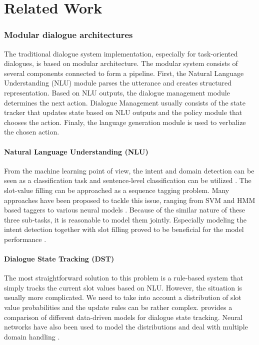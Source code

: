 \chapter{Related Work}%
\label{chap:related}
\label{sec:relwork}

\subsection{Modular dialogue architectures}
\label{relwork:modular}
The traditional dialogue system implementation, especially for task-oriented dialogues, is based on modular architecture.
The modular system consists of several components connected to form a pipeline.
First, the Natural Language Understanding (NLU) module parses the utterance and creates structured representation.
Based on NLU outputs, the dialogue management module determines the next action.
Dialogue Management usually consists of the state tracker that updates state based on NLU outputs and the policy module that chooses the action.
Finaly, the language generation module is used to verbalize the chosen action.
\subsubsection{Natural Language Understanding (NLU)}
From the machine learning point of view, the intent and domain detection can be seen as a classification task and sentence-level classification can be utilized \cite{yaman2008integrative,schapire2000boostexter}.
The slot-value filling can be approached as a sequence tagging problem.
Many approaches have been proposed to tackle this issue, ranging from SVM \cite{shi2016recurrent} and HMM \cite{surendran2006dialog} based taggers to various neural models \cite{adel2016comparing, zhang2017position, mesnil2014using}.
Because of the similar nature of these three sub-tasks, it is reasonable to model them jointly.
Especially modeling the intent detection together with slot filling proved to be beneficial for the model performance \cite{zhang2017position, liu2016attention, xu2013convolutional}.

\subsubsection{Dialogue State Tracking (DST)} 
\label{relwork:DST}
The most straightforward solution to this problem is a rule-based system that simply tracks the current slot values based on NLU.
However, the situation is usually more complicated.
We need to take into account a distribution of slot value probabilities and the update rules can be rather complex.
\citet{vzilka2013comparison} provides a comparison of different data-driven models for dialogue state tracking.
Neural networks have also been used to model the distributions \cite{mrkvsic2016neural, zhong2018global} and deal with multiple domain handling \cite{rastogi2017scalable}.

